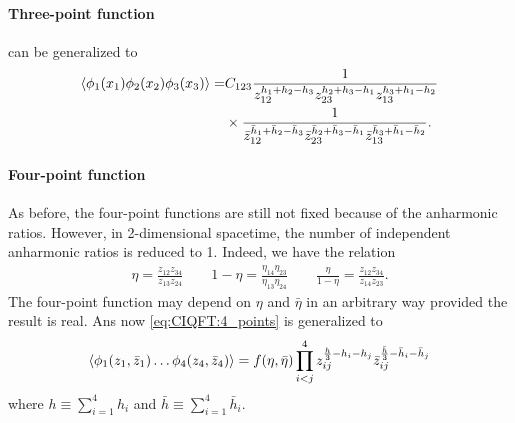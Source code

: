 \documentclass[10pt]{article}
\begin{document}
\paragraph{Three-point function}
 can be generalized to
\begin{align}
    \expval{\phi_1(x_1)\phi_2(x_2)\phi_3(x_3)}= & C_{123}\frac{1}{z_{12}^{h_1+h_2-h_3}z_{23}^{h_2+h_3-h_1}z_{13}^{h_3+h_1-h_2}}\notag                                                                   \\
                                                & \times\frac{1}{\bar{z}_{12}^{\bar{h}_1+\bar{h}_2-\bar{h}_3}\bar{z}_{23}^{\bar{h}_2+\bar{h}_3-\bar{h}_1}\bar{z}_{13}^{\bar{h}_3+\bar{h}_1-\bar{h}_2}}.\label{eq:2dcft:3_point}
\end{align}
\paragraph{Four-point function}
As before, the four-point functions are still not fixed because of the anharmonic ratios.
However, in 2-dimensional spacetime, the number of independent anharmonic ratios is reduced to 1.
Indeed, we have the relation
\begin{align}
    \eta=\frac{z_{12}z_{34}}{z_{13}z_{24}}\quad\quad1-\eta=\frac{\eta_{14}\eta_{23}}{\eta_{13}\eta_{24}}\quad\quad\frac{\eta}{1-\eta}=\frac{z_{12}z_{34}}{z_{14}z_{23}}.
\end{align}
The four-point function may depend on $\eta$ and $\bar{\eta}$ in an arbitrary way provided the result is real.
Ans now \cref{eq:CIQFT:4_points} is generalized to
\begin{align}
    \expval{\phi_1(z_1,\bar{z}_1)\dots\phi_4(z_4,\bar{z}_4)}=f(\eta,\bar{\eta})\prod_{i<j}^4 z_{ij}^{\frac{h}{3}-h_i-h_j}\bar{z}_{ij}^{\frac{\bar{h}}{3}-\bar{h}_i-\bar{h}_j}
\end{align}
where $h\equiv\sum_{i=1}^4 h_i$ and $\bar{h}\equiv\sum_{i=1}^4\bar{h}_i$.
\end{document}
